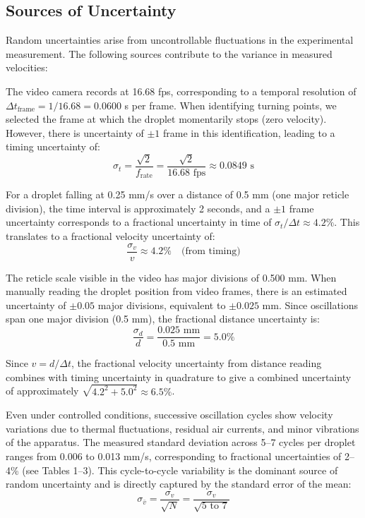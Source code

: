 \documentclass[11pt]{article}
\begin{document}
\subsection{Sources of Uncertainty}

Random uncertainties arise from uncontrollable fluctuations in the experimental measurement. The following sources contribute to the variance in measured velocities:

The video camera records at 16.68 fps, corresponding to a temporal resolution of $\Delta t_{\text{frame}} = 1/16.68 = 0.0600$ s per frame. When identifying turning points, we selected the frame at which the droplet momentarily stops (zero velocity). However, there is uncertainty of $\pm 1$ frame in this identification, leading to a timing uncertainty of:
\begin{equation}
\sigma_t = \frac{\sqrt{2}}{f_{\text{rate}}} = \frac{\sqrt{2}}{16.68 \text{ fps}} \approx 0.0849 \text{ s}
\end{equation}

For a droplet falling at 0.25 mm/s over a distance of 0.5 mm (one major reticle division), the time interval is approximately 2 seconds, and a $\pm 1$ frame uncertainty corresponds to a fractional uncertainty in time of $\sigma_t / \Delta t \approx 4.2\%$. This translates to a fractional velocity uncertainty of:
\begin{equation}
\frac{\sigma_v}{v} \approx 4.2\% \quad \text{(from timing)}
\end{equation}

The reticle scale visible in the video has major divisions of 0.500 mm. When manually reading the droplet position from video frames, there is an estimated uncertainty of $\pm 0.05$ major divisions, equivalent to $\pm 0.025$ mm. Since oscillations span one major division (0.5 mm), the fractional distance uncertainty is:
\begin{equation}
\frac{\sigma_d}{d} = \frac{0.025 \text{ mm}}{0.5 \text{ mm}} = 5.0\%
\end{equation}

Since $v = d / \Delta t$, the fractional velocity uncertainty from distance reading combines with timing uncertainty in quadrature to give a combined uncertainty of approximately $\sqrt{4.2^2 + 5.0^2} \approx 6.5\%$.

Even under controlled conditions, successive oscillation cycles show velocity variations due to thermal fluctuations, residual air currents, and minor vibrations of the apparatus. The measured standard deviation across 5--7 cycles per droplet ranges from 0.006 to 0.013 mm/s, corresponding to fractional uncertainties of 2--4\% (see Tables 1--3). This cycle-to-cycle variability is the dominant source of random uncertainty and is directly captured by the standard error of the mean:
\begin{equation}
\sigma_{\bar{v}} = \frac{\sigma_v}{\sqrt{N}} = \frac{\sigma_v}{\sqrt{5 \text{ to } 7}}
\end{equation}
\end{document}
